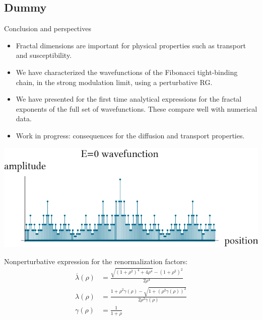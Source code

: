 \documentclass[xcolor=x11names,compress,professionalfonts]{beamer}
\renewcommand{\(}{\begin{columns}}
\renewcommand{\)}{\end{columns}}
\newcommand{\<}[1]{\begin{column}{#1}}
\renewcommand{\>}{\end{column}}
\newcommand{\lb}{\ensuremath{\overline{\lambda}}}
\begin{document}
\subsection{Dummy}
\begin{frame}{Conclusion and perspectives}
\begin{itemize}
	\item Fractal dimensions are important for physical properties such as transport and susceptibility.
	\item We have characterized the wavefunctions of the Fibonacci tight-binding chain, in the strong modulation limit, using a perturbative RG.
	\item We have presented for the first time analytical expressions for the fractal exponents of the full set of wavefunctions. These compare well with numerical data.
	\item Work in progress: consequences for the diffusion and transport properties.
\end{itemize}
	\centering
	\includegraphics[scale=.55]{E0_wavefunction.pdf}
\end{frame}

\begin{frame}
Nonperturbative expression for the renormalization factors:
\begin{align*}
\label{eq:lb}
	\lb(\rho) &= \frac{\sqrt{(1+\rho^2)^4+4\rho^4}-(1+\rho^2)^2}{2\rho^4}\\
	\lambda(\rho) &= \frac{1+\rho^2 \gamma(\rho) - \sqrt{1+(\rho^2 \gamma(\rho))^2}}{2 \rho^2\gamma(\rho)} \\
	\gamma(\rho) &= \frac{1}{1+\rho}
\end{align*}
\end{frame}
\end{document}
